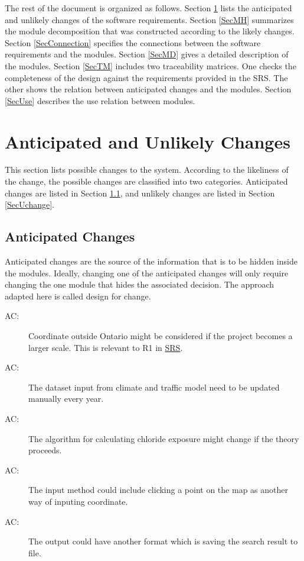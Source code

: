 \documentclass[12pt, titlepage]{article}
\newcounter{acnum}
\newcommand{\actheacnum}{AC\theacnum}
\begin{document}
The rest of the document is organized as follows. Section
\ref{SecChange} lists the anticipated and unlikely changes of the software
requirements. Section \ref{SecMH} summarizes the module decomposition that
was constructed according to the likely changes. Section \ref{SecConnection}
specifies the connections between the software requirements and the
modules. Section \ref{SecMD} gives a detailed description of the
modules. Section \ref{SecTM} includes two traceability matrices. One checks
the completeness of the design against the requirements provided in the SRS. The
other shows the relation between anticipated changes and the modules. Section
\ref{SecUse} describes the use relation between modules.

\section{Anticipated and Unlikely Changes} \label{SecChange}

This section lists possible changes to the system. According to the likeliness
of the change, the possible changes are classified into two
categories. Anticipated changes are listed in Section \ref{SecAchange}, and
unlikely changes are listed in Section \ref{SecUchange}.

\subsection{Anticipated Changes} \label{SecAchange}

Anticipated changes are the source of the information that is to be hidden
inside the modules. Ideally, changing one of the anticipated changes will only
require changing the one module that hides the associated decision. The approach
adapted here is called design for change.

\begin{description}
\item[ \actheacnum \label{acMoreCoordinate}:] Coordinate outside Ontario might be considered if the project becomes a larger scale. This is relevant to R1 in \href{https://github.com/CynthiaLiu0805/BridgeCorrosion/blob/main/docs/SRS/SRS.pdf}{SRS}.
\item[ \actheacnum \label{acInput}:] The dataset input from climate and traffic model need to be updated manually every year.
\item[ \actheacnum \label{acAlgorithm}:] The algorithm for calculating chloride exposure might change if the theory proceeds.
\item[ \actheacnum \label{acInputMethod}:] The input method could include clicking a point on the map as another way of inputing coordinate.
\item[ \actheacnum \label{acOutputFile}:] The output could have another format which is saving the search result to file.

\end{description}
\end{document}
